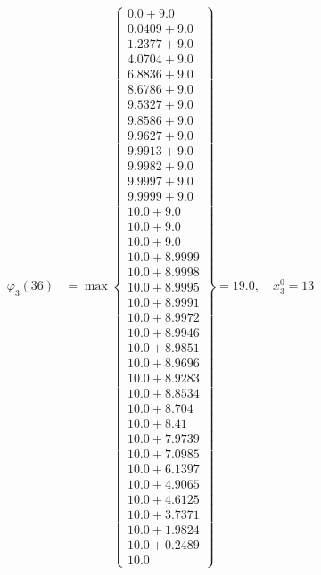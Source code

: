 \documentclass{article}
\begin{document}
\begin{align*}
  
\varphi_{3}(36) &= \max \left\{ \begin{array}{c}
0.0 + 9.0 \\
 0.0409 + 9.0 \\
 1.2377 + 9.0 \\
 4.0704 + 9.0 \\
 6.8836 + 9.0 \\
 8.6786 + 9.0 \\
 9.5327 + 9.0 \\
 9.8586 + 9.0 \\
 9.9627 + 9.0 \\
 9.9913 + 9.0 \\
 9.9982 + 9.0 \\
 9.9997 + 9.0 \\
 9.9999 + 9.0 \\
 10.0 + 9.0 \\
 10.0 + 9.0 \\
 10.0 + 9.0 \\
 10.0 + 8.9999 \\
 10.0 + 8.9998 \\
 10.0 + 8.9995 \\
 10.0 + 8.9991 \\
 10.0 + 8.9972 \\
 10.0 + 8.9946 \\
 10.0 + 8.9851 \\
 10.0 + 8.9696 \\
 10.0 + 8.9283 \\
 10.0 + 8.8534 \\
 10.0 + 8.704 \\
 10.0 + 8.41 \\
 10.0 + 7.9739 \\
 10.0 + 7.0985 \\
 10.0 + 6.1397 \\
 10.0 + 4.9065 \\
 10.0 + 4.6125 \\
 10.0 + 3.7371 \\
 10.0 + 1.9824 \\
 10.0 + 0.2489 \\
 10.0
\end{array} \right\}=19.0,\quad x_{3}^0=13\\
  
  
\end{align*}
\end{document}
